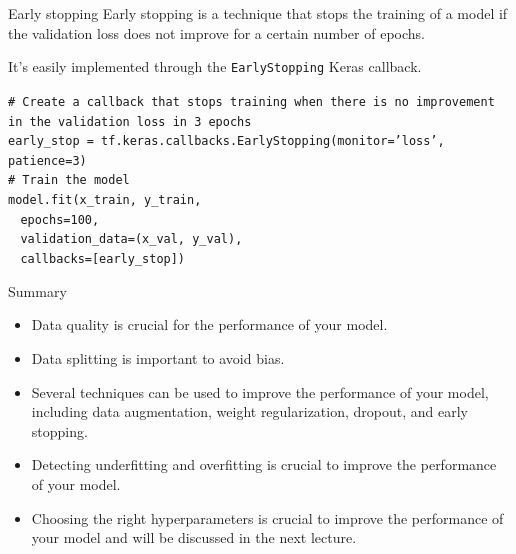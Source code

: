 \documentclass[9pt, aspectratio=169]{beamer}
\begin{document}
\begin{frame}
    {Early stopping}
    Early stopping is a technique that stops the training of a model if the validation loss does not improve for a certain number of epochs.

    It's easily implemented through the \texttt{EarlyStopping} Keras callback.

    \begin{codebox}
        \texttt{\# Create a callback that stops training when there is no improvement in the validation loss in 3 epochs\\
        early\_stop = tf.keras.callbacks.EarlyStopping(monitor='loss', patience=3)\\
        \# Train the model\\
        model.fit(x\_train, y\_train,\\
        $~~~~$epochs=100,\\
        $~~~~$validation\_data=(x\_val, y\_val),\\
        $~~~~$callbacks=[early\_stop])
        }
    \end{codebox}

\end{frame}

\begin{frame}
    {Summary}
    \begin{itemize}
        \item Data quality is crucial for the performance of your model.
        \item Data splitting is important to avoid bias.
        \item Several techniques can be used to improve the performance of your model, including data augmentation, weight regularization, dropout, and early stopping.
        \item Detecting underfitting and overfitting is crucial to improve the performance of your model.
        \item Choosing the right hyperparameters is crucial to improve the performance of your model and will be discussed in the next lecture.
    \end{itemize}
\end{frame}
\end{document}
